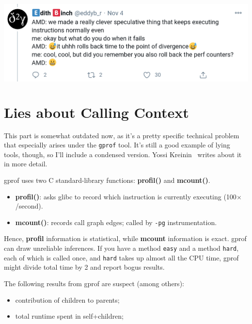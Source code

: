 \documentclass[a4paper]{report}
\begin{document}
\begin{center}
\includegraphics{images/L27-eb-tweet.png}
\end{center}

\section*{Lies about Calling Context}
This part is somewhat outdated now, as it's a pretty specific technical problem that especially arises under the {\tt gprof} tool. It's still a good example of lying tools, though,
so I'll include a condensed version. Yossi Kreinin~\cite{lies} writes about it in more detail.

gprof uses two C standard-library functions: {\bf profil()} and {\bf mcount()}.

\vspace*{-1em}
\begin{itemize}[noitemsep]
\item {\bf profil()}: asks glibc to record which instruction 
  is currently executing (100$\times$/second).
\item {\bf mcount()}: records call graph edges; called by {\tt -pg} instrumentation.
\end{itemize}
\vspace*{-1em}

Hence, {\bf profil} information is statistical, while {\bf mcount}
information is exact.  gprof can draw unreliable inferences. If you have a method \texttt{easy} and a method \texttt{hard}, each of which is called once, and \texttt{hard} takes up almost all the CPU time,
gprof might divide total time by 2 and report bogus results.

The following results from gprof are suspect (among others):
\vspace*{-1em}
\begin{itemize}[noitemsep]
  \item contribution of children to parents;
  \item total runtime spent in self+children;
\end{itemize}
\vspace*{-1em}
\end{document}
